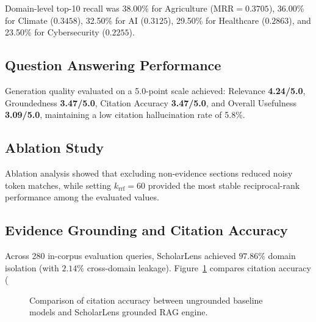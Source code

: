 \documentclass[conference]{IEEEtran}
\begin{document}
Domain-level top-10 recall was 38.00\% for Agriculture ($\text{MRR}=0.3705$), 36.00\% for Climate ($0.3458$), 32.50\% for AI ($0.3125$), 29.50\% for Healthcare ($0.2863$), and 23.50\% for Cybersecurity ($0.2255$).

\subsection{Question Answering Performance}

Generation quality evaluated on a 5.0-point scale achieved: Relevance \textbf{4.24/5.0}, Groundedness \textbf{3.47/5.0}, Citation Accuracy \textbf{3.47/5.0}, and Overall Usefulness \textbf{3.09/5.0}, maintaining a low citation hallucination rate of 5.8\%.

\subsection{Ablation Study}

Ablation analysis showed that excluding non-evidence sections reduced noisy token matches, while setting $k_{\text{rrf}}=60$ provided the most stable reciprocal-rank performance among the evaluated values.

\subsection{Evidence Grounding and Citation Accuracy}

Across 280 in-corpus evaluation queries, ScholarLens achieved $97.86\%$ domain isolation (with $2.14\%$ cross-domain leakage). Figure~\ref{fig:hallucination_rate} compares citation accuracy (%

\begin{figure}[htbp]
\centering
{}
\caption{Comparison of citation accuracy between ungrounded baseline models and ScholarLens grounded RAG engine.}
\label{fig:hallucination_rate}
\end{figure}
\end{document}
